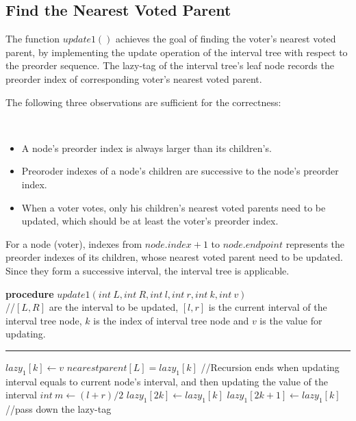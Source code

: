 \subsection{Find the Nearest Voted Parent}
\label{sec:step2}
The function $update1()$ achieves the goal of finding the voter's nearest voted parent, by implementing the update operation of the interval tree with respect to the preorder sequence. The lazy-tag of the interval tree's leaf node records the preorder index of corresponding voter's nearest voted parent. 

The following three observations are sufficient for the correctness:
\begin{observation}
\
	\begin{itemize}
	    \item A node's preorder index is always larger than its children's.
	    \item Preoroder indexes of a node's children are successive to the node's preorder index. 
	    \item When a voter votes, only his children's nearest voted parents need to be updated, which should be at least the voter's preorder index.
	\end{itemize}
\end{observation}
For a node (voter), indexes from $node.index+1$ to $node.endpoint$ represents the preorder indexes of its children, whose nearest voted parent need to be updated. Since they form a successive interval, the interval tree is applicable. 
\begin{algorithm}
	\textbf{procedure} $update1(int~L,int ~R, int~l, int~r, int~k, int~v)${\color{gray}
		\\//$[L,R]$ are the interval to be updated, $[l,r]$ is the current interval of the interval tree node, $k$ is the index of  interval tree node and $v$ is the value for updating.}
	\hrule
	{
		 {$lazy_1[k] \leftarrow v$}
		 {$nearestparent[L] = lazy_1[k]$}
		{\color{gray}
			//Recursion ends when updating interval equals to current node's interval, and then updating the value of the interval}
	}
	{
		$int~m \leftarrow (l+r)/2$\;
		 {$lazy_1[2k] \leftarrow lazy_1[k]$}
		 {$lazy_1[2k+1] \leftarrow lazy_1[k]${\color{gray}
				//pass down the lazy-tag}}
	}
\end{algorithm}

